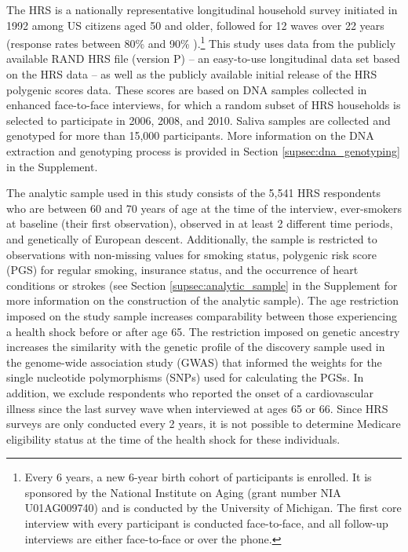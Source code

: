 \documentclass[12pt]{article}
\begin{document}
\noindent The HRS is a nationally representative longitudinal household survey initiated in 1992 among US citizens aged 50 and older, followed for 12 waves over 22 years (response rates between 80\% and 90\% \cite{HRSResponseRate}).\footnote{
Every 6 years, a new 6-year birth cohort of participants is enrolled.\cite{HRS21stCentury}
It is sponsored by the National Institute on Aging (grant number NIA U01AG009740) and is conducted by the University of Michigan.\cite{HRSWebsite}
The first core interview with every participant is conducted face-to-face, and all follow-up interviews are either face-to-face or over the phone.\cite{HRS21stCentury}
}
This study uses data from the publicly available RAND HRS file (version P)\cite{HRSRAND} -- an easy-to-use longitudinal data set based on the HRS data -- as well as the publicly available initial release of the HRS polygenic scores data.\cite{HRSPGENSCORE} These scores are based on DNA samples collected in enhanced face-to-face interviews, for which a random subset of HRS households is selected to participate in 2006, 2008, and 2010. Saliva samples are collected and genotyped for more than 15,000 participants.\cite{HRSPGenscore2017} More information on the DNA extraction and genotyping process is provided in Section \ref*{supsec:dna_genotyping} in the Supplement.

The analytic sample used in this study consists of the 5,541 HRS respondents who are between 60 and 70 years of age at the time of the interview, ever-smokers at baseline (their first observation), observed in at least 2 different time periods, and genetically of European descent. Additionally, the sample is restricted to observations with non-missing values for smoking status, polygenic risk score (PGS) for regular smoking, insurance status, and the occurrence of heart conditions or strokes (see Section \ref*{supsec:analytic_sample} in the Supplement for more information on the construction of the analytic sample). The age restriction imposed on the study sample increases comparability between those experiencing a health shock before or after age 65. The restriction imposed on genetic ancestry increases the similarity with the genetic profile of the discovery sample used in the genome-wide association study\cite{TAG2010} (GWAS) that informed the weights for the single nucleotide polymorphisms (SNPs) used for calculating the PGSs.\cite{HRSPGenscore2017}
In addition, we exclude respondents who reported the onset of a cardiovascular illness since the last survey wave when interviewed at ages 65 or 66. Since HRS surveys are only conducted every 2 years, it is not possible to determine Medicare eligibility status at the time of the health shock for these individuals.
\end{document}
